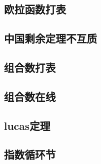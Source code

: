 \subsection{欧拉函数打表}


\subsection{中国剩余定理不互质}


\subsection{组合数打表}


\subsection{组合数在线}


\subsection{lucas定理}


\subsection{指数循环节}


